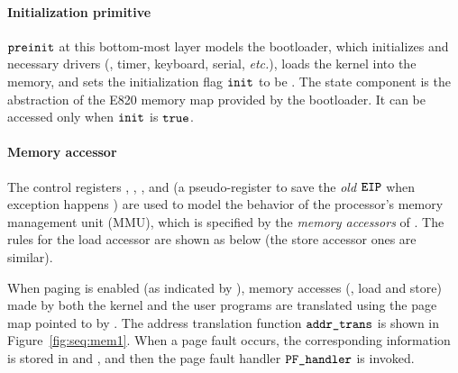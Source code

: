 \paragraph{Initialization primitive}
${\texttt{preinit}}$
at this bottom-most layer models the bootloader,
which initializes  and necessary drivers
(\eg, timer, keyboard, serial, {\it etc.}),
loads the kernel into the memory,
and sets the initialization flag ${\texttt{init}}$ to be .
The state component  is the abstraction of the
E820 memory map provided by the bootloader.
It can be accessed only when 
${\texttt{init}}$ is ${\texttt{true}}$.

\paragraph{Memory accessor} 
The control registers , ,  ,
and 
(a pseudo-register to save the \emph{old ${\texttt{EIP}}$} when exception happens
)
are used to model the behavior
of the processor's memory management unit (MMU),
which is specified by the \emph{memory accessors}
of .
The rules for the load accessor are shown as below
(the store accessor ones are similar).

When paging is enabled (as indicated by ),
memory accesses (\ie, load and store) made by both the kernel and the user programs
are translated using the page map pointed to by .
The address translation function
${\texttt{addr\_trans}}$ is
shown in Figure~\ref{fig:seq:mem1}.
When a page fault occurs,
the corresponding information is stored in 
and ,
and then the page fault handler ${\texttt{PF\_handler}}$ is invoked.

